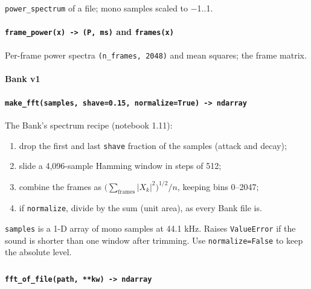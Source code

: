 \documentclass[
  10pt,
]{article}
\providecommand{\tightlist}{%
  \setlength{\itemsep}{0pt}\setlength{\parskip}{0pt}}
\begin{document}
\texttt{power\_spectrum} of a file; mono samples scaled to
−1..1.

\paragraph{\texorpdfstring{\texttt{frame\_power(x)\ -\textgreater{}\ (P,\ ms)}
and
\texttt{frames(x)}}{frame\_power(x) -\textgreater{} (P, ms) and frames(x)}}

Per-frame power spectra \texttt{(n\_frames,\ 2048)} and mean
squares; the frame matrix.

\paragraph{Bank v1}

\paragraph{\texorpdfstring{\texttt{make\_fft(samples,\ shave=0.15,\ normalize=True)\ -\textgreater{}\ ndarray}}{make\_fft(samples, shave=0.15, normalize=True) -\textgreater{} ndarray}}

The Bank's spectrum recipe (notebook 1.11):

\begin{enumerate}
\def\labelenumi{\arabic{enumi}.}
\tightlist
\item
  drop the first and last \texttt{shave} fraction of the
  samples (attack and decay);
\item
  slide a 4,096-sample Hamming window in steps of 512;
\item
  combine the frames as $\bigl(\sum_{\text{frames}} |X_k|^2\bigr)^{1/2} / n$,
  keeping bins 0--2047;
\item
  if \texttt{normalize}, divide by the sum (unit area), as
  every Bank file is.
\end{enumerate}

\texttt{samples} is a 1-D array of mono samples at 44.1 kHz.
Raises \texttt{ValueError} if the sound is shorter than one
window after trimming. Use \texttt{normalize=False} to keep
the absolute level.

\paragraph{\texorpdfstring{\texttt{fft\_of\_file(path,\ **kw)\ -\textgreater{}\ ndarray}~\textsuperscript{\textdagger}}{fft\_of\_file(path, **kw) -\textgreater{} ndarray (needs pydub)}}
\end{document}
